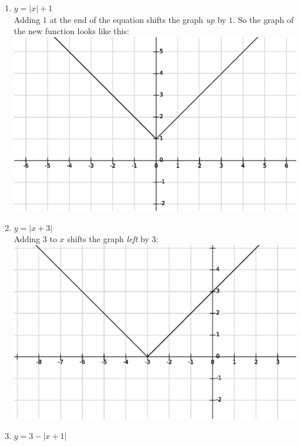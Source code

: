 \documentclass{article}
\begin{document}
\begin{enumerate}[label=(\alph*)]

\item $y=|x|+1$ \\

Adding $1$ at the end of the equation shifts the graph \textit{up} by $1$. 
So the graph of the new function looks like this: \\

\includegraphics[scale=0.6]{figure_1}

\item $y=|x+3|$ \\

Adding $3$ to $x$ shifts the graph \textit{left} by $3$: \\

\includegraphics[scale=0.6]{figure_2}

\item $y=3-|x+1|$ \\


\end{enumerate}
\end{document}
